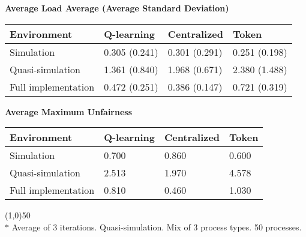 \documentclass{article}
\newcommand{\envtbl}[5]{
\begin{center}
\textbf{#1}
\end{center}

\begin{tabularx}{\linewidth}{|X|X|X|X|} \hline
	\textbf{Environment} & \textbf{Q-learning} & \textbf{Centralized} & \textbf{Token} \\ \hline
	#2
\end{tabularx}

\begin{center}
\textbf{#3}
\end{center}

\begin{tabularx}{\linewidth}{|X|X|X|X|} \hline
	\textbf{Environment} & \textbf{Q-learning} & \textbf{Centralized} & \textbf{Token} \\ \hline
	#4
\end{tabularx}

\vspace{1em}
\line(1,0){50} \\
#5
}
\begin{document}
\clearpage

\envtbl{Average Load Average (Average Standard Deviation)}
{	Simulation  & 0.305 (0.241) & 0.301 (0.291) & 0.251 (0.198)  \\ \hline
	Quasi-simulation  & 1.361 (0.840) & 1.968 (0.671) & 2.380 (1.488) \\ \hline
	Full implementation & 0.472 (0.251) & 0.386 (0.147) & 0.721 (0.319) \\ \hline}
{Average Maximum Unfairness}
{	Simulation  & 0.700 & 0.860 & 0.600  \\ \hline
	Quasi-simulation  & 2.513 & 1.970 & 4.578 \\ \hline
	Full implementation & 0.810 & 0.460 & 1.030 \\ \hline}
{$*$ Average of 3 iterations.  Quasi-simulation.  Mix of 3 process types.  50
processes.}
\end{document}
